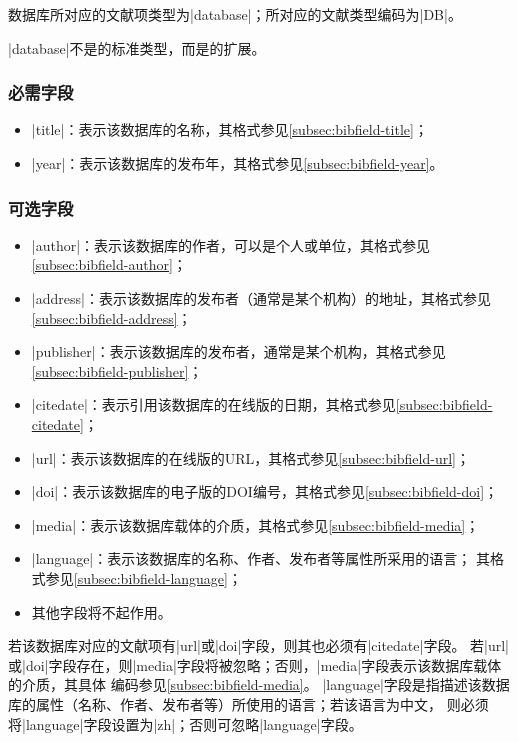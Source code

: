 数据库所对应的{\BibTeX}文献项类型为|database|；所对应的文献类型编码为|DB|\cite{gbt7714-2005}。

|database|不是{\BibTeX}的标准类型，而是{\njuthesis}的扩展。

\subsubsection{必需字段}

\begin{itemize}
\item |title|：表示该数据库的名称，其格式参见\ref{subsec:bibfield-title}；
\item |year|：表示该数据库的发布年，其格式参见\ref{subsec:bibfield-year}。
\end{itemize}

\subsubsection{可选字段}

\begin{itemize}
\item |author|：表示该数据库的作者，可以是个人或单位，其格式参见\ref{subsec:bibfield-author}；
\item |address|：表示该数据库的发布者（通常是某个机构）的地址，其格式参见
  \ref{subsec:bibfield-address}；
\item |publisher|：表示该数据库的发布者，通常是某个机构，其格式参见
  \ref{subsec:bibfield-publisher}；
\item |citedate|：表示引用该数据库的在线版的日期，其格式参见\ref{subsec:bibfield-citedate}；
\item |url|：表示该数据库的在线版的URL，其格式参见\ref{subsec:bibfield-url}；
\item |doi|：表示该数据库的电子版的DOI编号，其格式参见\ref{subsec:bibfield-doi}；
\item |media|：表示该数据库载体的介质，其格式参见\ref{subsec:bibfield-media}；
\item |language|：表示该数据库的名称、作者、发布者等属性所采用的语言；
其格式参见\ref{subsec:bibfield-language}；
\item 其他字段将不起作用。
\end{itemize}

\begin{note}
若该数据库对应的文献项有|url|或|doi|字段，则其也必须有|citedate|字段。
若|url|或|doi|字段存在，则|media|字段将被忽略；否则，|media|字段表示该数据库载体的介质，其具体
编码参见\ref{subsec:bibfield-media}。
|language|字段是指描述该数据库的属性（名称、作者、发布者等）所使用的语言；若该语言为中文，
则必须将|language|字段设置为|zh|；否则可忽略|language|字段。
\end{note}

